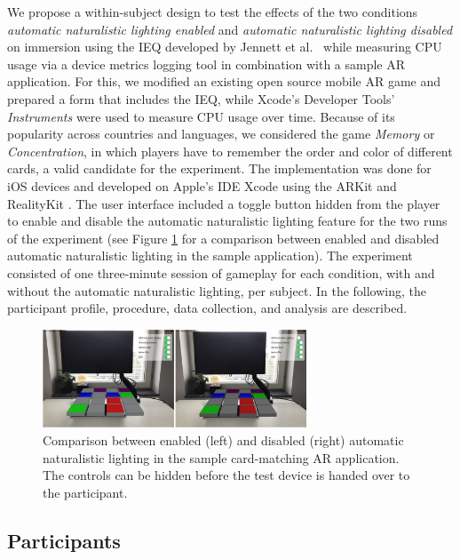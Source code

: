 \documentclass[12pt,twoside,english]{article}
\begin{document}
We propose a within-subject design to test the effects of the two conditions \textit{automatic naturalistic lighting enabled} and \textit{automatic naturalistic lighting disabled} on immersion using the \gls{IEQ} developed by Jennett et al.~\cite{jennett_measuring_2008} while measuring \gls{CPU} usage via a device metrics logging tool in combination with a sample \gls{AR} application.
For this, we modified an existing open source mobile \gls{AR} game and prepared a form that includes the \gls{IEQ}, while Xcode's Developer Tools' \textit{Instruments} were used to measure \gls{CPU} usage over time.
Because of its popularity across countries and languages, we considered the game \textit{Memory} or \textit{Concentration}, in which players have to remember the order and color of different cards, a valid candidate for the experiment.
The implementation was done for iOS devices and developed on Apple's \gls{IDE} Xcode using the ARKit and RealityKit .
The user interface included a toggle button hidden from the player to enable and disable the automatic naturalistic lighting feature for the two runs of the experiment (see Figure \ref{fig:sample_app_comparison} for a comparison between enabled and disabled automatic naturalistic lighting in the sample application).
The experiment consisted of one three-minute session of gameplay for each condition, with and without the automatic naturalistic lighting, per subject.
In the following, the participant profile, procedure, data collection, and analysis are described.

\begin{figure}[h]
    \centering
    \includegraphics[width=0.7\textwidth]{imgs/sample_app_comparison.png}
    \caption{Comparison between enabled (left) and disabled (right) automatic naturalistic lighting in the sample card-matching \gls{AR} application. The controls can be hidden before the test device is handed over to the participant.}
    \label{fig:sample_app_comparison}
\end{figure}

\subsection{Participants}
\label{sect:participants}
\end{document}
